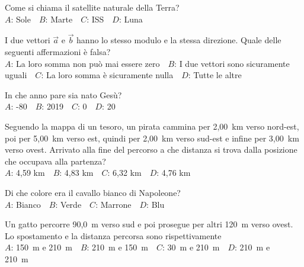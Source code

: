\mcquestionheader Come si chiama il satellite naturale della Terra?\\
{$A$}: Sole\ \ {$B$}: Marte\ \ {$C$}: ISS\ \ {$D$}: Luna\ \ 

\mcquestionfooter



\def\mcquestionnumber{2}


\mcquestionheader I due vettori $\vec{a}$ e $\vec{b}$ hanno lo stesso modulo e la stessa direzione. Quale delle seguenti affermazioni è falsa?\\
{$A$}: La loro somma non può mai essere zero\ \ {$B$}: I due vettori sono sicuramente uguali\ \ {$C$}: La loro somma è sicuramente nulla\ \ {$D$}: Tutte le altre\ \ 

\mcquestionfooter



\def\mcquestionnumber{3}


\mcquestionheader In che anno pare sia nato Gesù?\\
{$A$}: -80\ \ {$B$}: 2019\ \ {$C$}: 0\ \ {$D$}: 20\ \ 

\mcquestionfooter



\def\mcquestionnumber{4}


\mcquestionheader Seguendo la mappa di un tesoro, un pirata cammina per 2,00~km verso nord-est, poi per 5,00~km verso est, quindi per 2,00~km verso sud-est e infine per 3,00~km verso ovest. Arrivato alla fine del percorso a che distanza si trova dalla posizione che occupava alla partenza?\\
{$A$}: 4,59 km\ \ {$B$}: 4,83 km\ \ {$C$}: 6,32 km\ \ {$D$}: 4,76 km\ \ 

\mcquestionfooter



\def\mcquestionnumber{5}


\mcquestionheader Di che colore era il cavallo bianco di Napoleone?\\
{$A$}: Bianco\ \ {$B$}: Verde\ \ {$C$}: Marrone\ \ {$D$}: Blu\ \ 

\mcquestionfooter



\def\mcquestionnumber{6}


\mcquestionheader Un gatto percorre 90,0~m verso sud e poi prosegue per altri 120~m verso ovest. Lo spostamento e la distanza percorsa sono rispettivamente\\
{$A$}: 150~m e 210~m\ \ {$B$}: 210~m e 150~m\ \ {$C$}: 30~m e 210~m\ \ {$D$}: 210~m e 210~m\ \ 

